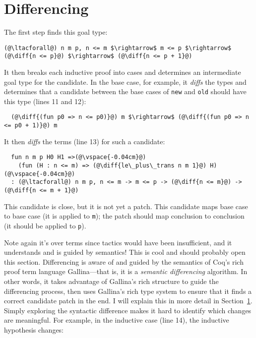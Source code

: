 \section{Differencing}
\label{sec:pumpkin-diff}


The first step finds this goal type:

\begin{lstlisting}[language=coq]
  (@\ltacforall@) n m p, n <= m $\rightarrow$ m <= p $\rightarrow$ (@\diff{n <= p}@) $\rightarrow$ (@\diff{n <= p + 1}@)
\end{lstlisting}
It then breaks each inductive proof into cases and determines an intermediate goal type for the candidate.
In the base case, for example, it \textit{diffs} the types and determines that a candidate
between the base cases of \lstinline{new} and \lstinline{old} should have this type (lines 11 and 12):

\begin{lstlisting}
  (@\diff{(fun p0 => n <= p0)}@) m $\rightarrow$ (@\diff{(fun p0 => n <= p0 + 1)}@) m
\end{lstlisting}
It then \textit{diffs} the terms (line 13) for such a candidate:

\begin{lstlisting}
  fun n m p H0 H1 =>(@\vspace{-0.04cm}@)
    (fun (H : n <= m) => (@\diff{le\_plus\_trans n m 1}@) H)(@\vspace{-0.04cm}@)
  : (@\ltacforall@) n m p, n <= m -> m <= p -> (@\diff{n <= m}@) -> (@\diff{n <= m + 1}@)
\end{lstlisting}
This candidate is close, but it is not yet a patch. This candidate
maps base case to base case (it is applied to \lstinline{m}); the patch should map conclusion to conclusion (it should
be applied to \lstinline{p}). %

Note again it's over terms since tactics would have been insufficient,
and it understands and is guided by semantics! This is cool and should probably open this section.
Differencing is aware of and guided by the semantics of Coq's rich proof term language Gallina---that is, it is a \textit{semantic differencing} algorithm.
In other words, it takes advantage of Gallina's rich structure to guide the differencing process,
then uses Gallina's rich type system to ensure that it finds a correct candidate patch in the end.
I will explain this in more detail in Section~\ref{sec:pumpkin-diff}.
Simply exploring the syntactic difference %
makes it hard to identify
which changes are meaningful.
For example, in the inductive case (line 14), the inductive hypothesis
changes:

